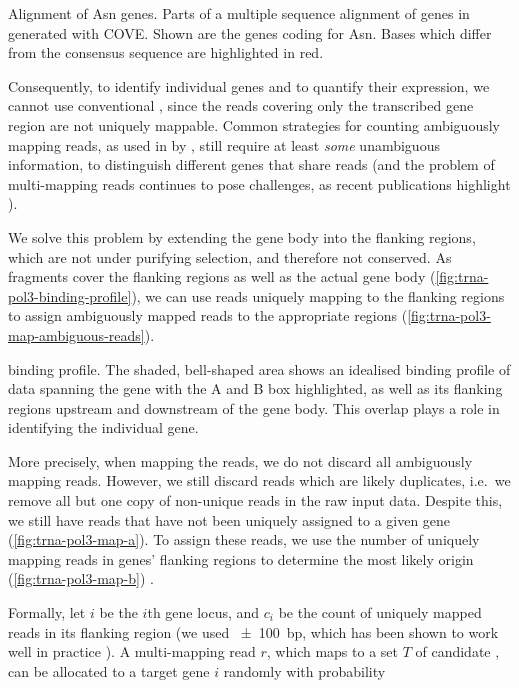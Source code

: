     {\footnotesize
    }
    {Alignment of Asn \trna genes.}
    {Parts of a multiple sequence alignment of \trna genes in \mmu generated
    with COVE\@. Shown are the \trna genes coding for Asn. Bases which differ
    from the consensus sequence are highlighted in red.}

Consequently, to identify individual \trna genes and to quantify their
expression, we cannot use conventional \rnaseq, since the \rna reads covering
only the transcribed gene region are not uniquely mappable. Common strategies
for counting ambiguously mapping reads, as used in  by
\citet{Mortazavi:2008}, still require at least \emph{some} unambiguous
information, to distinguish different genes that share reads (and the problem of
multi-mapping reads continues to pose challenges, as recent publications
highlight \citep{Kahles:2015}).

We solve this problem by extending the \trna gene body into the flanking
regions, which are not under purifying selection, and therefore not conserved.
As  \chipseq fragments cover the flanking regions as well as the actual
gene body (\cref{fig:trna-pol3-binding-profile}), we can use reads uniquely
mapping to the flanking regions to assign ambiguously mapped reads to the
appropriate regions (\cref{fig:trna-pol3-map-ambiguous-reads}).

    {\trna {} \chip binding profile.}
    {The shaded, bell-shaped area shows an idealised binding profile of \chipseq
    data spanning the \trna gene with the A and B box highlighted, as well as
    its flanking regions upstream and downstream of the gene body. This overlap
    plays a role in identifying the individual gene.}

More precisely, when mapping the reads, we do not discard all ambiguously
mapping reads. However, we still discard reads which are likely \pcr duplicates,
i.e.\ we remove all but one copy of non-unique reads in the raw input data.
Despite this, we still have reads that have not been uniquely assigned to a
given \trna gene (\cref{fig:trna-pol3-map-a}). To assign these reads, we use the
number of uniquely mapping reads in \trna genes’ flanking regions to determine
the most likely origin (\cref{fig:trna-pol3-map-b}) \citep{Kutter:2011}.

Formally, let \(i\) be the \(i\)th \trna gene locus, and \(c_i\) be the count of
uniquely mapped reads in its flanking region (we used \SI{\pm100}{bp}, which has
been shown to work well in practice \citep{Kutter:2011}). A multi-mapping read
\(r\), which maps to a set \(T\) of candidate \trna[s], can be allocated to a
target \trna gene \(i\) randomly with probability


